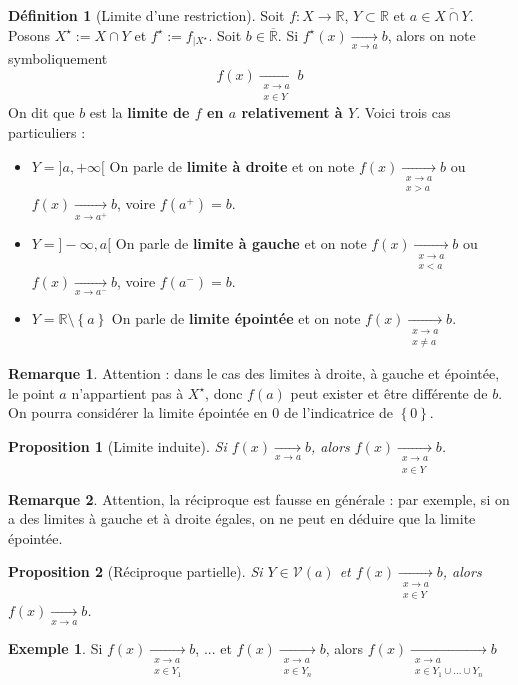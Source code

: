 \documentclass[french]{book}
\newcommand{\R}{\mathbb{R}}
\newcommand{\st}{^\star}
\theoremstyle{plain}
\newtheorem{prop}{Proposition}[chapter]
\theoremstyle{definition}
\newtheorem{dfn}{Définition}[chapter]
\newtheorem{exa}{Exemple}[chapter]
\newtheorem{rmq}{Remarque}[chapter]
\theoremstyle{remark}
\begin{document}
\begin{dfn}[Limite d'une restriction]
	Soit $f:X\rightarrow\R$, $Y\subset\R$ et $a\in\overline{X\cap Y}$. Posons $X\st:=X\cap Y$  et $f\st:=f_{|X\st}$. Soit $b\in\overline{\R}$. Si $f\st(x)\xrightarrow[x\to a]{}b$, alors on note symboliquement $$f(x)\xrightarrow[\substack{x\to a\\ x\in Y}]{}b$$ On dit que $b$ est la \textbf{limite de $f$ en $a$ relativement à $Y$}. Voici trois cas particuliers : 
	\begin{itemize}
		\item $Y=]a,+\infty[$ On parle de \textbf{limite à droite} et on note $f(x)\xrightarrow[\substack{x\to a\\ x>a}]{}b$ ou $f(x)\xrightarrow[x\to a^+]{}b$, voire $f(a^+)=b$.
		\item $Y=]-\infty,a[$ On parle de \textbf{limite à gauche} et on note $f(x)\xrightarrow[\substack{x\to a\\ x<a}]{}b$ ou $f(x)\xrightarrow[x\to a^-]{}b$, voire $f(a^-)=b$.
		\item $Y=\R\setminus\left\{a\right\}$ On parle de \textbf{limite épointée} et on note $f(x)\xrightarrow[\substack{x\to a\\ x\ne a}]{}b$.
	\end{itemize}
\end{dfn}
\begin{rmq}
	Attention : dans le cas des limites à droite, à gauche et épointée, le point $a$ n'appartient pas à $X\st$, donc $f(a)$ peut exister et être différente de $b$. On pourra considérer la limite épointée en $0$ de l'indicatrice de $\left\{0\right\}$.
\end{rmq}
\begin{prop}[Limite induite]
	Si $f(x)\xrightarrow[x\to a]{}b$, alors $f(x)\xrightarrow[\substack{x\to a\\ x\in Y}]{}b$.
\end{prop}
\begin{rmq}
	Attention, la réciproque est fausse en générale : par exemple, si on a des limites à gauche et à droite égales, on ne peut en déduire que la limite épointée.
\end{rmq}
\begin{prop}[Réciproque partielle]
	Si $Y\in\mathcal{V}(a)$ et $f(x)\xrightarrow[\substack{x\to a\\ x\in Y}]{}b$, alors $f(x)\xrightarrow[x\to a]{}b$.
\end{prop}
\begin{exa}
	Si $f(x)\xrightarrow[\substack{x\to a\\ x\in Y_1}]{}b$, ... et $f(x)\xrightarrow[\substack{x\to a\\ x\in Y_n}]{}b$, alors $f(x)\xrightarrow[\substack{x\to a\\ x\in Y_1\cup\ldots\cup Y_n}]{}b$
\end{exa}
\end{document}
